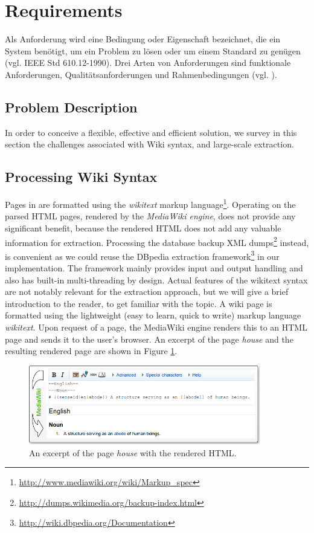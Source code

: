 \section{Requirements}
\label{sec:requirements}
Als Anforderung wird eine Bedingung oder Eigenschaft bezeichnet, die ein System benötigt, um ein Problem zu lösen oder um einem Standard zu genügen (vgl. IEEE Std 610.12-1990). Drei Arten von Anforderungen sind funktionale Anforderungen, Qualitätsanforderungen und Rahmenbedingungen (vgl. \cite{young}). 

\subsection{Problem Description}
\label{sec:problem}

In order to conceive a flexible, effective and efficient solution, we survey in this section the challenges associated with Wiki syntax, \wik and large-scale extraction.

\subsection{Processing Wiki Syntax}
Pages in \wik are formatted using the \textit{wikitext} markup language\footnote{\url{http://www.mediawiki.org/wiki/Markup_spec}}.
Operating on the parsed HTML pages, rendered by the \emph{MediaWiki engine}, does not provide any significant benefit, because the rendered HTML does not add any valuable information for extraction. 
Processing the database backup XML dumps\footnote{\url{http://dumps.wikimedia.org/backup-index.html}} instead, is convenient as we could reuse the DBpedia extraction framework\footnote{\url{http://wiki.dbpedia.org/Documentation}} in our implementation. The framework mainly provides input and output handling and also has built-in multi-threading by design.
Actual features of the wikitext syntax are not notably relevant for the extraction approach, but we will give a brief introduction to the reader, to get familiar with the topic. 
A wiki page is formatted using the lightweight (easy to learn, quick to write) markup language \textit{wikitext}. 
Upon request of a page, the MediaWiki engine renders this to an HTML page and sends it to the user's browser. 
An excerpt of the \wik page \textit{house} and the resulting rendered page are shown in Figure \ref{fig:wikitext}.

\begin{figure}[tb]
\centering
\includegraphics[width=0.9\textwidth]{./images/wikitext.png}
\caption{An excerpt of the \wik page \textit{house} with the rendered HTML.}
\label{fig:wikitext}
\end{figure}

